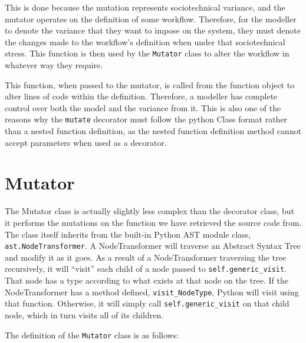 This is done because the mutation represents sociotechnical variance, and the mutator operates on the definition of some workflow. Therefore, for the modeller to denote the variance that they want to impose on the system, they must denote the changes made to the workflow's definition when under that sociotechnical stress. This function is then used by the \texttt{Mutator} class to alter the workflow in whatever way they require. \par

This function, when passed to the mutator, is called from the function object to alter lines of code within the definition. Therefore, a modeller has complete control over both the model and the variance from it. This is also one of the reasons why the \texttt{mutate} decorator must follow the python Class format rather than a nested function definition, as the nested function definition method cannot accept parameters when used as a decorator. \par

\section{Mutator}
\label{mutator_implementation}
The Mutator class is actually slightly less complex than the decorator class, but it performs the mutations on the function we have retrieved the source code from. The class itself inherits from the built-in Python AST module class, \texttt{ast.NodeTransformer}\cite{32.2.24:online}. A NodeTransformer will traverse an Abstract Syntax Tree and modify it as it goes. As a result of a NodeTransformer traversing the tree recursively, it will ``visit'' each child of a node passed to \texttt{self.generic\_visit}. That node has a type according to what exists at that node on the tree. If the NodeTransformer has a method defined, \texttt{visit\_NodeType}, Python will visit using that function. Otherwise, it will simply call \texttt{self.generic\_visit} on that child node, which in turn visits all of its children. \par

The definition of the \texttt{Mutator} class is as follows: \par

